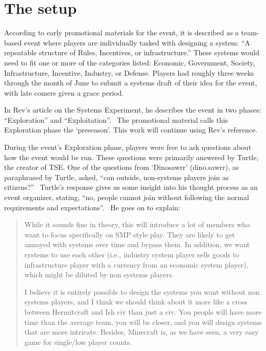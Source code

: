 \section{The setup}
According to early promotional materials for the event, it is described as a team-based event where players are individually tasked with designing a system: “A repeatable structure of Rules, Incentives, or infrastructure.” These systems would need to fit one or more of the categories listed: Economic, Government, Society, Infrastructure, Incentive, Industry, or Defense. Players had roughly three weeks through the month of June to submit a systems draft of their idea for the event, with late comers given a grace period.

In Rev's article on the Systems Experiment, he describes the event in two phases: “Exploration” and “Exploitation”.~\citep{Rev(2026)} The promotional material calls this Exploration phase the `preseason'. This work will continue using Rev's reference.

During the event's Exploration phase, players were free to ask questions about how the event would be run. These questions were primarily answered by Turtle, the creator of TSE. One of the questions from `Dinosawrr' (dino.sawrr), as paraphrased by Turtle, asked, “can outside, non-systems players join as citizens?”~\citep{Turtle(2026a)} Turtle's response gives us some insight into his thought process as an event organizer, stating, “no, people cannot join without following the normal requirements and expectations”.~\citep{Turtle(2026a)} He goes on to explain:

\begin{quotation}
    While it sounds fine in theory, this will introduce a lot of members who want to focus specifically on SMP style play. They are likely to get annoyed with systems over time and bypass them. In addition, we want systems to use each other (i.e., industry system player sells goods to infrastructure player with a currency from an economic system player), which might be diluted by non systems players.

    I believe it is entirely possible to design the systems you want without non systems players, and I think we should think about it more like a cross between Hermitcraft and Ish civ than just a civ. You people will have more time than the average team, you will be closer, and you will design systems that are more intricate. Besides, Minecraft is, as we have seen, a very easy game for single/low player counts.~\citep{Turtle(2026a)}
\end{quotation}

